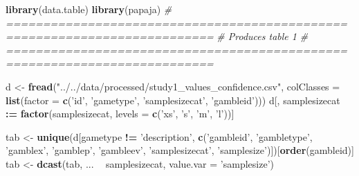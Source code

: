 \documentclass[]{standalone}
\newenvironment{Shaded}{\begin{snugshade}}{\end{snugshade}}
\newcommand{\CommentTok}[1]{\textcolor[rgb]{0.56,0.35,0.01}{\textit{#1}}}
\newcommand{\DataTypeTok}[1]{\textcolor[rgb]{0.13,0.29,0.53}{#1}}
\newcommand{\ErrorTok}[1]{\textcolor[rgb]{0.64,0.00,0.00}{\textbf{#1}}}
\newcommand{\KeywordTok}[1]{\textcolor[rgb]{0.13,0.29,0.53}{\textbf{#1}}}
\newcommand{\NormalTok}[1]{#1}
\newcommand{\OperatorTok}[1]{\textcolor[rgb]{0.81,0.36,0.00}{\textbf{#1}}}
\newcommand{\StringTok}[1]{\textcolor[rgb]{0.31,0.60,0.02}{#1}}
\begin{document}
\begin{Shaded}
\begin{Highlighting}[]
\KeywordTok{library}\NormalTok{(data.table)}
\KeywordTok{library}\NormalTok{(papaja)}
\CommentTok{# ==========================================================================}
\CommentTok{# Produces table 1}
\CommentTok{# ==========================================================================}


\NormalTok{d <-}\StringTok{ }\KeywordTok{fread}\NormalTok{(}\StringTok{"../../data/processed/study1_values_confidence.csv"}\NormalTok{, }\DataTypeTok{colClasses =} \KeywordTok{list}\NormalTok{(}\DataTypeTok{factor =} \KeywordTok{c}\NormalTok{(}\StringTok{'id'}\NormalTok{, }\StringTok{'gametype'}\NormalTok{, }\StringTok{'samplesizecat'}\NormalTok{, }\StringTok{'gambleid'}\NormalTok{)))}
\NormalTok{d[, samplesizecat }\OperatorTok{:}\ErrorTok{=}\StringTok{ }\KeywordTok{factor}\NormalTok{(samplesizecat, }\DataTypeTok{levels =} \KeywordTok{c}\NormalTok{(}\StringTok{'xs'}\NormalTok{, }\StringTok{'s'}\NormalTok{, }\StringTok{'m'}\NormalTok{, }\StringTok{'l'}\NormalTok{))]}

\NormalTok{tab <-}\StringTok{ }\KeywordTok{unique}\NormalTok{(d[gametype }\OperatorTok{!=}\StringTok{ 'description'}\NormalTok{, }\KeywordTok{c}\NormalTok{(}\StringTok{'gambleid'}\NormalTok{, }\StringTok{'gambletype'}\NormalTok{, }\StringTok{'gamblex'}\NormalTok{, }\StringTok{'gamblep'}\NormalTok{, }\StringTok{'gambleev'}\NormalTok{, }\StringTok{'samplesizecat'}\NormalTok{, }\StringTok{'samplesize'}\NormalTok{)])[}\KeywordTok{order}\NormalTok{(gambleid)]}
\NormalTok{tab <-}\StringTok{ }\KeywordTok{dcast}\NormalTok{(tab, ... }\OperatorTok{~}\StringTok{ }\NormalTok{samplesizecat, }\DataTypeTok{value.var =} \StringTok{'samplesize'}\NormalTok{)}



\end{Highlighting}
\end{Shaded}
\end{document}
